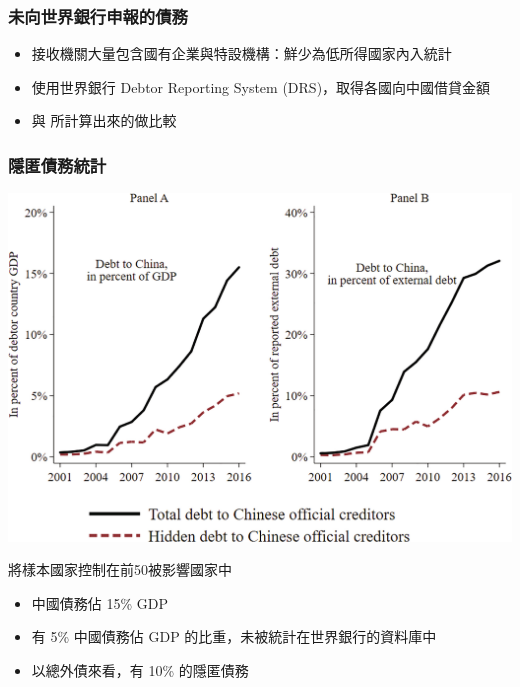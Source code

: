 \begin{frame}
    \frametitle{未向世界銀行申報的債務}


    \begin{itemize}
        \item 接收機關大量包含國有企業與特設機構：鮮少為低所得國家內入統計
        \item 使用世界銀行 Debtor Reporting System (DRS)，取得各國向中國借貸金額\footnotemark{}
        \item 與 \citet*{Horn-Reinhart-Trebesch-21} 所計算出來的做比較
    \end{itemize}


\end{frame}

\begin{frame}
    \frametitle{隱匿債務統計}

    \includegraphics[width = \textwidth]{fig/fig12.jpg}

\end{frame}

\begin{frame}
將樣本國家控制在前50被影響國家中
\begin{itemize}
    \item 中國債務佔 15\% GDP
    \item 有 5\% 中國債務佔 GDP 的比重，未被統計在世界銀行的資料庫中
    \item 以總外債來看，有 10\% 的隱匿債務
\end{itemize}

\end{frame}


